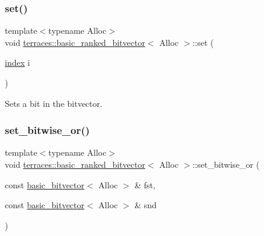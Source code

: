\mbox{\label{classterraces_1_1basic__ranked__bitvector_ad586efd4696b4d1b9c6a2d01afd7f6e8}} 
\subsubsection{\texorpdfstring{set()}{set()}}
{\footnotesize\ttfamily template$<$typename Alloc$>$ \\
void \hyperlink{classterraces_1_1basic__ranked__bitvector}{terraces\+::basic\+\_\+ranked\+\_\+bitvector}$<$ Alloc $>$\+::set (\begin{DoxyParamCaption}\item[{\hyperlink{namespaceterraces_adbc33ccb543d1634e96d0eb02e472c77}{index}}]{i }\end{DoxyParamCaption})\hspace{0.3cm}{\ttfamily [inline]}}

Sets a bit in the bitvector. \mbox{\label{classterraces_1_1basic__ranked__bitvector_addd524d9185ed8415909b1bba88102ea}} 
\subsubsection{\texorpdfstring{set\+\_\+bitwise\+\_\+or()}{set\_bitwise\_or()}}
{\footnotesize\ttfamily template$<$typename Alloc$>$ \\
void \hyperlink{classterraces_1_1basic__ranked__bitvector}{terraces\+::basic\+\_\+ranked\+\_\+bitvector}$<$ Alloc $>$\+::set\+\_\+bitwise\+\_\+or (\begin{DoxyParamCaption}\item[{const \hyperlink{classterraces_1_1basic__bitvector}{basic\+\_\+bitvector}$<$ Alloc $>$ \&}]{fst,  }\item[{const \hyperlink{classterraces_1_1basic__bitvector}{basic\+\_\+bitvector}$<$ Alloc $>$ \&}]{snd }\end{DoxyParamCaption})}

